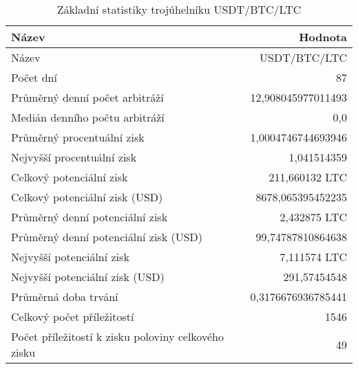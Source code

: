 \begin{table}\centering
\caption{Základní statistiky trojúhelníku USDT/BTC/LTC}
\label{USDTBTCLTC_stats}
\begin{tabular}{|| l | r ||}
\hline Název & Hodnota \\ 
\hline\hline Název & USDT/BTC/LTC \\ 
\hline Počet dní & 87 \\ 
\hline Průměrný denní počet arbitráží & 12,908045977011493 \\ 
\hline Medián denního počtu arbitráží & 0,0 \\ 
\hline Průměrný procentuální zisk & 1,0004746744693946 \\ 
\hline Nejvyšší procentuální zisk & 1,041514359 \\ 
\hline Celkový potenciální zisk & 211,660132 LTC \\ 
\hline Celkový potenciální zisk (USD) & 8678,065395452235 \\ 
\hline Průměrný denní potenciální zisk & 2,432875 LTC \\ 
\hline Průměrný denní potenciální zisk (USD) & 99,74787810864638 \\ 
\hline Nejvyšší potenciální zisk & 7,111574 LTC \\ 
\hline Nejvyšší potenciální zisk (USD) & 291,57454548 \\ 
\hline Průměrná doba trvání & 0,3176676936785441 \\ 
\hline Celkový počet příležitostí & 1546 \\ 
\hline Počet příležitostí k zisku poloviny celkového zisku & 49 \\ 
\hline
\end{tabular}
\end{table}